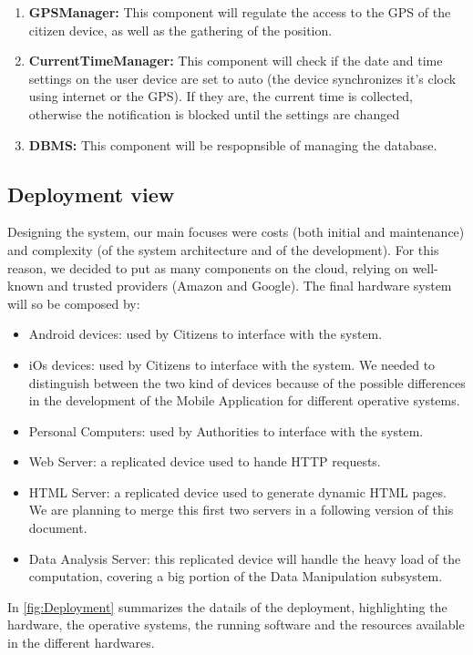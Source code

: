 \documentclass{article}
\newcommand{\enum}[1]{\texttt{#1.\arabic*}}
\begin{document}
\begin{enumerate}[label=\enum{COMP}]
		 \item \label{component:GPSManager} \textbf{GPSManager:}
		 	This component will regulate the access to the GPS of the citizen device, as well as the gathering of the position.
		 \item \label{component:CurrentTimeManager} \textbf{CurrentTimeManager:}
		 	This component will check if the date and time settings on the user device are set to auto (the device synchronizes it's clock using 
		 	internet or the GPS). If they are, the current time is collected, otherwise the notification is blocked until the settings are changed
		 \item \label{component:DBMS} \textbf{DBMS:}
		 	This component will be respopnsible of managing the database.
	\end{enumerate}
	\newpage \FloatBarrier
	\subsection{Deployment view} 
	Designing the system, our main focuses were costs (both initial and maintenance) and complexity (of the system architecture and of the development).
	For this reason, we decided to put as many components on the cloud, relying on well-known and trusted providers (Amazon and Google). The final hardware system will so be composed by:
	\begin{itemize}
		\item Android devices: used by Citizens to interface with the system.
		\item iOs devices: used by Citizens to interface with the system. We needed to distinguish between the two kind of devices because of the possible differences in the development of the Mobile Application for different operative systems.
		\item Personal Computers: used by Authorities to interface with the system.
		\item Web Server: a replicated device used to hande HTTP requests.
		\item HTML Server: a replicated device used to generate dynamic HTML pages. We are planning to merge this first two servers in a following version of this document.
		\item Data Analysis Server: this replicated device will handle the heavy load of the computation, covering a big portion of the Data Manipulation subsystem.
	\end{itemize}
	In \cref{fig:Deployment} summarizes the datails of the deployment, highlighting the hardware, the operative systems, the running software and the resources available in the different hardwares.
\end{document}
